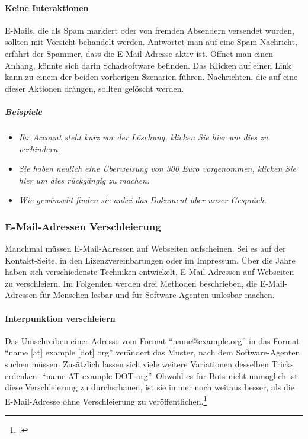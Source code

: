 \paragraph{Keine Interaktionen}
\label{par:keine-interaktionen}

E-Mails, die als Spam markiert oder von fremden Absendern versendet wurden,
sollten mit Vorsicht behandelt werden. Antwortet man auf eine Spam-Nachricht,
erfährt der Spammer, dass die E-Mail-Adresse aktiv ist. Öffnet man einen
Anhang, könnte sich darin Schadsoftware befinden. Das Klicken auf einen Link
kann zu einem der beiden vorherigen Szenarien führen. Nachrichten, die auf eine
dieser Aktionen drängen, sollten gelöscht werden.

\subparagraph{Beispiele}
\label{spar:beispiele}

\begin{itemize}
\item
  \emph{Ihr Account steht kurz vor der Löschung, klicken Sie hier um dies zu
  verhindern.}
\item
  \emph{Sie haben neulich eine Überweisung von 300 Euro vorgenommen, klicken
  Sie hier um dies rückgängig zu machen.}
\item
  \emph{Wie gewünscht finden sie anbei das Dokument über unser Gespräch.}
\end{itemize}

\subsubsection{E-Mail-Adressen Verschleierung}
\label{ssub:e-mail-adressen-verschleierung}

Manchmal müssen E-Mail-Adressen auf Webseiten aufscheinen. Sei es auf der
Kontakt-Seite, in den Lizenzvereinbarungen oder im Impressum. Über die Jahre
haben sich verschiedenste Techniken entwickelt, E-Mail-Adressen auf Webseiten
zu verschleiern. Im Folgenden werden drei Methoden beschrieben, die
E-Mail-Adressen für Menschen lesbar und für Software-Agenten unlesbar machen.

\paragraph{Interpunktion verschleiern}
\label{par:interpunktion-verschleiern}

Das Umschreiben einer Adresse vom Format \enquote{name@example.org} in das
Format \enquote{name {[}at{]} example {[}dot{]} org} verändert das Muster, nach
dem Software-Agenten suchen müssen. Zusätzlich lassen sich viele weitere
Variationen desselben Tricks erdenken: \enquote{name-AT-example-DOT-org}.
Obwohl es für Bots nicht unmöglich ist diese Verschleierung zu durchschauen,
ist sie immer noch weitaus besser, als die E-Mail-Adresse ohne Verschleierung
zu veröffentlichen.\footcite{obfuscateEmailAddresses}

